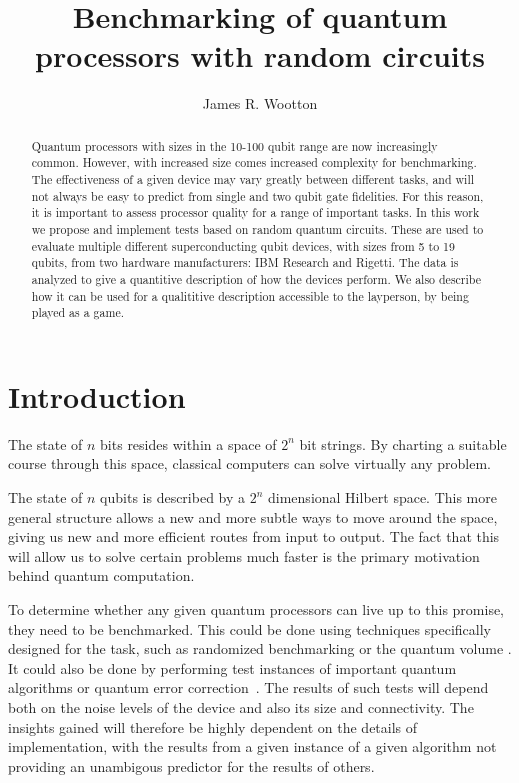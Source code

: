 \documentclass[aps,prl,twocolumn,showpacs,preprintnumbers]{revtex4-1}
\begin{document}
\title{Benchmarking of quantum processors with random circuits}
\author{James R. Wootton}


\begin{abstract}

Quantum processors with sizes in the 10-100 qubit range are now increasingly common. However, with increased size comes increased complexity for benchmarking. The effectiveness of a given device may vary greatly between different tasks, and will not always be  easy to predict from single and two qubit gate fidelities. For this reason, it is important to assess processor quality for a range of important tasks. In this work we propose and implement tests based on random quantum circuits. These are used to evaluate multiple different superconducting qubit devices, with sizes from 5 to 19 qubits, from two hardware manufacturers: IBM Research and Rigetti. The data is analyzed to give a quantitive description of how the devices perform.  We also describe how it can be used for a qualititive description accessible to the layperson, by being played as a game.


\end{abstract}



\maketitle


\section{Introduction}

The state of $n$ bits resides within a space of $2^n$ bit strings. By charting a suitable course through this space, classical computers can solve virtually any problem.

The state of $n$ qubits is described by a $2^n$ dimensional Hilbert space. This more general structure allows a new and more subtle ways to move around the space, giving us new and more efficient routes from input to output. The fact that this will allow us to solve certain problems much faster is the primary motivation behind quantum computation.

To determine whether any given quantum processors can live up to this promise, they need to be benchmarked. This could be done using techniques specifically designed for the task, such as randomized benchmarking \cite{emerson:05,magesan:11} or the quantum volume \cite{moll:17}. It could also be done by performing test instances of important quantum algorithms \cite{coles:18} or quantum error correction~\cite{wootton:18,naveh:18}. The results of such tests will depend both on the noise levels of the device and also its size and connectivity. The insights gained will therefore be highly dependent on the details of implementation, with the results from a given instance of a given algorithm not providing an unambigous predictor for the results of others.
\end{document}
